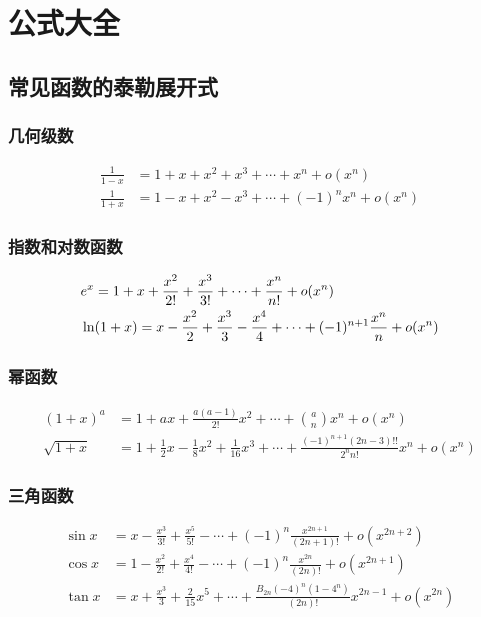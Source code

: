 \chapter{公式大全}
\section{常见函数的泰勒展开式}		

\subsection*{几何级数}
\begin{align*}
    \displaystyle \frac{1}{1 - x} &= 1 + x + x^2 + x^3 + \cdots + x^n + o(x^n) \\
    \displaystyle \frac{1}{1 + x} &= 1 - x + x^2 - x^3 + \cdots + (-1)^n x^n + o(x^n)
\end{align*}

\subsection*{指数和对数函数}
\begin{align*}
    \displaystyle & e^x = 1 + x + \frac{x^2}{2!} + \frac{x^3}{3!} + \cdots + \frac{x^n}{n!} + o(x^n) \\
    \displaystyle & \ln(1 + x) = x - \frac{x^2}{2} + \frac{x^3}{3} - \frac{x^4}{4} + \cdots + (-1)^{n+1} \frac{x^n}{n} + o(x^n)
\end{align*}

\subsection*{幂函数}
\begin{align*}
    \displaystyle (1 + x)^a &= 1 + a x + \frac{a(a-1)}{2!} x^2 + \cdots + \binom{a}{n} x^n + o(x^n) \\
    \displaystyle \sqrt{1 + x} &= \boxed{1 + \frac{1}{2}x - \frac{1}{8}x^2} + \frac{1}{16}x^3 + \cdots + \frac{(-1)^{n+1} (2n-3)!!}{2^n n!} x^n + o(x^n)
\end{align*}

\subsection*{三角函数}
\begin{align*}
    \displaystyle \sin x &= x - \frac{x^3}{3!} + \frac{x^5}{5!} - \cdots + (-1)^n \frac{x^{2n+1}}{(2n+1)!} + o(x^{2n+2}) \\
    \displaystyle \cos x &= 1 - \frac{x^2}{2!} + \frac{x^4}{4!} - \cdots + (-1)^n \frac{x^{2n}}{(2n)!} + o(x^{2n+1}) \\
    \displaystyle \tan x &= \boxed{x + \frac{x^3}{3} + \frac{2}{15}x^5} + \cdots + \frac{B_{2n} (-4)^n (1 - 4^n)}{(2n)!} x^{2n - 1} + o(x^{2n})
\end{align*}

